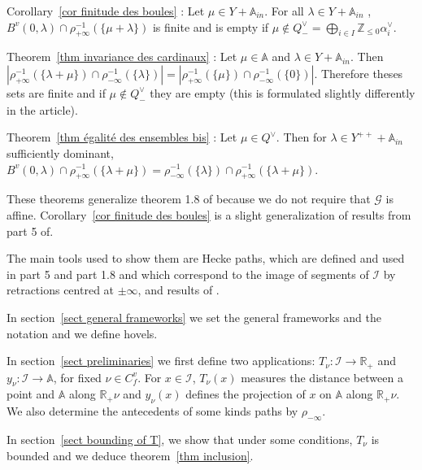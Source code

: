 \documentclass[12pt]{article}
\theoremstyle{plain}
\theoremstyle{definition}
\newcommand{\R}{\mathbb{R}}
\newcommand{\A}{\mathbb{A}}
\newcommand{\Z}{\mathbb{Z}}
\newcommand{\I}{\mathcal{I}}
\begin{document}
\vspace{3mm}
Corollary~\ref{cor finitude des boules} :
 Let $\mu\in Y+\A_{in}$. For all $\lambda\in Y+\A_{in}$ , $B^v(0,\lambda)\cap \rho_{+\infty}^{-1}(\{\mu+\lambda\})$ is finite and is empty if $\mu\notin Q^\vee_-=\bigoplus _{i\in I}\Z_{\leq 0}\alpha_i^\vee$.

\vspace{3mm}
Theorem~\ref{thm invariance des cardinaux} : 
Let $\mu\in \A$ and $\lambda\in Y+\A_{in}$. Then $|\rho_{+\infty}^{-1}(\{\lambda+\mu\})\cap\rho_{-\infty}^{-1}(\{\lambda\})|=|\rho_{+\infty}^{-1}(\{\mu\})\cap\rho_{-\infty}^{-1}(\{0\})|$. Therefore theses sets are finite and if $\mu\notin Q^\vee_-$ they are empty (this is formulated slightly differently in the article).

\vspace{3mm}
Theorem~\ref{thm égalité des ensembles bis} :
 Let $\mu\in Q^\vee$. Then for $\lambda\in Y^{++}+\A_{in}$ sufficiently dominant, $B^v(0,\lambda)\cap \rho_{+\infty}^{-1}(\{\lambda+\mu\})=\rho_{-\infty}^{-1}(\{\lambda\})\cap\rho_{+\infty}^{-1}(\{\lambda+\mu\})$.
\vspace{3mm}

These theorems generalize theorem 1.8 of \cite{braverman2014affine} because we do not require that $\mathcal{G}$ is affine. Corollary~\ref{cor finitude des boules} is a slight generalization of results from part 5 of\cite{gaussent2008kac}.
\vspace{3mm}


The main tools used to show them are Hecke paths, which are defined and used in \cite{gaussent2008kac} part 5 and \cite{gaussent2014spherical} part 1.8 and which correspond to the image of segments of $\mathcal{I}$ by retractions centred at $\pm\infty$, and results of \cite{gaussent2014spherical}.

In section~\ref{sect general frameworks} we set the general frameworks and the notation and we define hovels.

 In section~\ref{sect preliminaries} we first define two applications: $T_\nu:\I\rightarrow\R_+$ and $y_\nu:\I\rightarrow \A$, for fixed $\nu\in C_f^v$. For $x\in\I$, $T_\nu(x)$ measures the distance between a point and $\A$ along $\R_+\nu$ and $y_\nu(x)$ defines the projection of $x$ on $\A$ along $\R_+\nu$. We also determine the antecedents of some kinds paths by $\rho_{-\infty}$. 
 
 In section~\ref{sect bounding of T}, we show that under some conditions, $T_\nu$ is bounded and we deduce theorem~\ref{thm inclusion}. 
 
\end{document}
